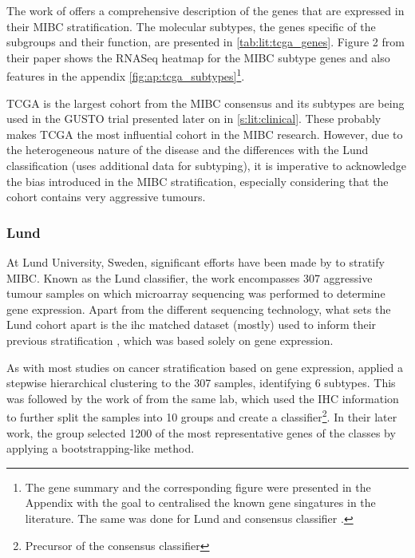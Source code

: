 The work of \citet{Robertson2017-mg} offers a comprehensive description of the genes that are expressed in their MIBC stratification. The molecular subtypes, the genes specific of the subgroups and their function, are presented in \cref{tab:lit:tcga_genes}. Figure 2 from their paper shows the RNASeq heatmap for the MIBC subtype genes and also features in the appendix \cref{fig:ap:tcga_subtypes}\footnote{The gene summary and the corresponding figure were presented in the Appendix with the goal to centralised the known gene singatures in the literature. The same was done for Lund and consensus classifier \citep{Marzouka2018-ge,Kamoun2020-tj}.}.


TCGA is the largest cohort from the MIBC consensus and its subtypes are being used in the GUSTO trial presented later on in \cref{s:lit:clinical}. These probably makes TCGA the most influential cohort in the MIBC research. However, due to the heterogeneous nature of the disease and the differences with the Lund classification (uses additional data for subtyping), it is imperative to acknowledge the bias introduced in the MIBC stratification, especially considering that the cohort contains very aggressive tumours.

\subsubsection*{Lund} \label{s:lit:lund_mibc}

At Lund University, Sweden, significant efforts have been made by \citep{Sjodahl2017-xr, Marzouka2018-ge} to stratify MIBC. Known as the Lund classifier, the work encompasses 307 aggressive tumour samples on which microarray sequencing was performed to determine gene expression. Apart from the different sequencing technology, what sets the Lund cohort apart is the \acrfull{ihc} matched dataset (mostly) used to inform their previous stratification \citet{Sjodahl2017-xr}, which was based solely on gene expression.

As with most studies on cancer stratification based on gene expression, \citet{Sjodahl2017-xr} applied a stepwise hierarchical clustering to the 307 samples, identifying 6 subtypes. This was followed by the work of \citet{Marzouka2018-ge} from the same lab, which used the IHC information to further split the samples into 10 groups and create a classifier\footnote{Precursor of the consensus classifier}. In their later work, the group selected 1200 of the most representative genes of the classes by applying a bootstrapping-like method.

